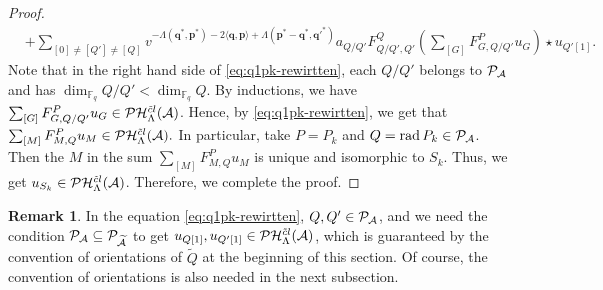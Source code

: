 \documentclass[reqno,12pt]{amsart}
\numberwithin{equation}{section}
\def\lr#1{\langle #1\rangle} \def\fin{\hfill$\square$}  \def\lra{\longrightarrow} \def\mod{\mbox{\rm \textbf{mod}}\,}\def\Mod{\mbox{\rm mod}\,}\def\top{\mbox{\rm top}\,}\def\soc{\mbox{\rm soc}\,}
\def\rad{\mbox{\rm rad}\,}\def\ad{\mbox{\rm ad}\,}\def\M{\mathcal{M}}\def\grad{\mbox{\rm grad}\,}
\theoremstyle{plain} %
\theoremstyle{definition} %
\newtheorem{remark}[theorem]{\bf Remark}
\begin{document}
\begin{proof}
\begin{align}
    &+\sum_{[0]\neq[Q']\neq[ Q]}v^{-\Lambda(\mathbf{q}^\ast,\mathbf{p}^\ast)-2\lr{\mathbf{q},\mathbf{p}}+\Lambda(\mathbf{p}^\ast-\mathbf{q}^\ast,\mathbf{q'}^\ast)}a_{Q/Q'}F_{Q/Q',Q'}^Q(\sum_{[G]}F_{G,Q/Q'}^{P}u_G)\star u_{Q'[1]}.
\end{align}
Note that in the right hand side of \eqref{eq:q1pk-rewirtten}, each $Q/Q'$ belongs to $\mathcal {P}_{\mathcal{A}}$ and has $\dim_{\mathbb{F}_q} Q/Q'<\dim_{\mathbb{F}_q} Q$. By inductions, we have $\sum_{[G]}F_{G,Q/Q'}^{P}u_G\in \mathcal {P}\mathcal {H}_\Lambda^{{\tilde{c}l}}({\mathcal{A}})$. Hence, by \eqref{eq:q1pk-rewirtten}, we get that $\sum_{[M]}F_{M,Q}^{P}u_M\in \mathcal {P}\mathcal {H}_\Lambda^{{\tilde{c}l}}({\mathcal{A}}).$
In particular, take $P=P_k$ and $Q=\rad P_k\in\mathcal {P}_{\A}$. Then the $M$ in the sum $\sum_{[M]}F_{M,Q}^{P}u_M$ is unique and isomorphic to $S_k$. Thus, we get $u_{S_k}\in \mathcal {P}\mathcal {H}_\Lambda^{{\tilde{c}l}}({\mathcal{A}})$. Therefore, we complete the proof.
\end{proof}
\begin{remark}
In the equation \eqref{eq:q1pk-rewirtten}, $Q,Q'\in\mathcal {P}_{\mathcal{A}}$, and we need the condition $\mathcal {P}_{\mathcal{A}}\subseteq\mathcal {P}_{\widetilde{\mathcal{A}}}$ to get $u_{Q[1]}, u_{Q'[1]}\in\mathcal {P}\mathcal {H}_\Lambda^{{\tilde{c}l}}({\mathcal{A}})$, which is guaranteed by the convention of orientations of $\widetilde{Q}$ at the beginning of this section. Of course, the convention of orientations is also needed in the next subsection.
\end{remark}
\end{document}
